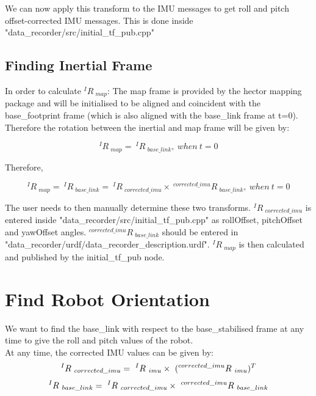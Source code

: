 \documentclass{article}
\begin{document}
We can now apply this transform to the IMU messages to get roll and pitch offset-corrected IMU messages. This is done inside "data\_recorder/src/initial\_tf\_pub.cpp"


\subsection{Finding Inertial Frame}
In order to calculate $ {^{I}R\ _{map}}$: The map frame is provided by the hector mapping package and will be initialised to be aligned and coincident with the base\_footprint frame (which is also aligned with the base\_link frame at t=0). Therefore the rotation between the inertial and map frame will be given by:

\begin{equation}
^{I}R\ _{map}=\ ^{I}R\ _{base\_link},\ when\ t=0
\end{equation}

Therefore,

\begin{equation}
^{I}R\ _{map}=\ ^{I}R\ _{base\_link}=\ ^{I}R\ _{corrected\_imu} \times\ ^{corrected\_imu}R\ _{base\_link},\ when\ t=0
\end{equation}

The user needs to then manually determine these two transforms. $^{I}R\ _{corrected\_imu}$ is entered inside "data\_recorder/src/initial\_tf\_pub.cpp" as rollOffset, pitchOffset and yawOffset angles. $^{corrected\_imu}R\ _{base\_link}$ should be entered in \\
"data\_recorder/urdf/data\_recorder\_description.urdf". $^{I}R\ _{map}$ is then calculated and published by the initial\_tf\_pub node.


\section{Find Robot Orientation}
We want to find the base\_link with respect to the base\_stabilised frame at any time to give the roll and pitch values of the robot.
\\

At any time, the corrected IMU values can be given by:
\begin{equation}
^{I}R\ _{corrected\_imu} =\ ^{I}R\ _{imu} \times\  (^{corrected\_imu}R\ _{imu})^T\\
\end{equation}
\begin{equation}
^{I}R\ _{base\_link} =\ ^{I}R\ _{corrected\_imu} \times\  ^{corrected\_imu}R\ _{base\_link}\\
\end{equation}
\end{document}
